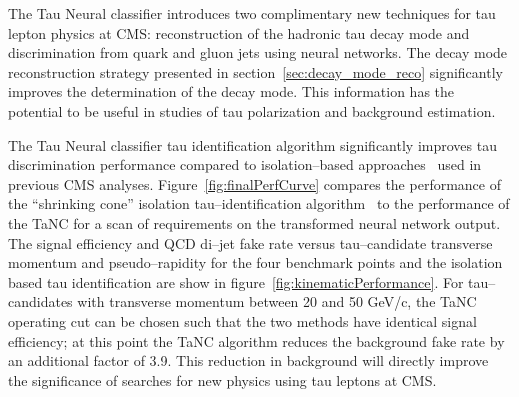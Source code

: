 The Tau Neural classifier introduces two complimentary new techniques for tau
lepton physics at CMS: reconstruction of the hadronic tau decay mode and
discrimination from quark and gluon jets using neural networks.  The decay mode
reconstruction strategy presented in section~\ref{sec:decay_mode_reco}
significantly improves the determination of the decay mode. This information has
the potential to be useful in studies of tau polarization and background
estimation.

The Tau Neural classifier tau identification algorithm significantly improves
tau discrimination performance compared to isolation--based
approaches~\cite{PFT08001} used in previous CMS analyses.
Figure~\ref{fig:finalPerfCurve} compares the performance of the ``shrinking
cone'' isolation tau--identification algorithm~\cite{PFT08001} to the
performance of the TaNC for a scan of requirements on the transformed neural
network output.  The signal efficiency and QCD di--jet fake rate versus
tau--candidate transverse momentum and pseudo--rapidity for the four benchmark
points and the isolation based tau identification are show in
figure~\ref{fig:kinematicPerformance}.  For tau--candidates with transverse
momentum between 20 and 50 GeV/c, the TaNC operating cut can be chosen such that
the two methods have identical signal efficiency; at this point the TaNC
algorithm reduces the background fake rate by an additional factor of 3.9.  This
reduction in background will directly improve the significance of searches for
new physics using tau leptons at CMS.

